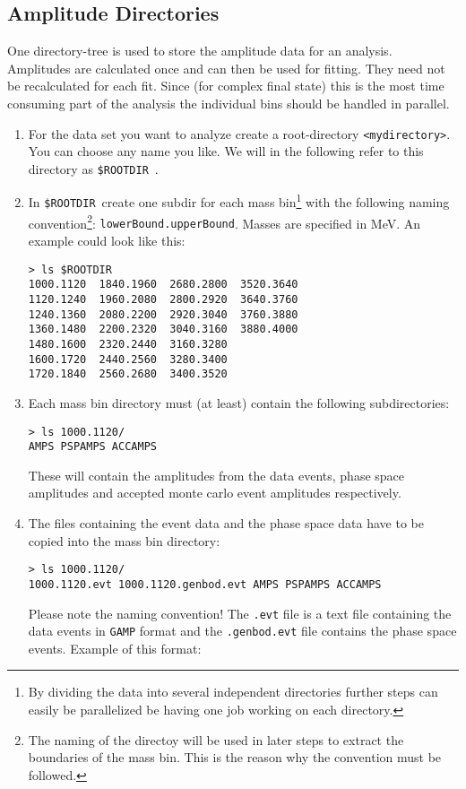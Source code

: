 \documentclass[12pt,a4paper]{article}
\newcommand{\rootdir} {{\tt \$ROOTDIR}~}
\begin{document}
{\subsection{Amplitude Directories}
One directory-tree is used to store the amplitude data for an analysis. Amplitudes are calculated once and can then be used for fitting. They need not be recalculated for each fit. Since (for complex final state) this is the most time consuming part of the analysis the individual bins should be handled in parallel.
\begin{enumerate}
\item For the data set you want to analyze create a root-directory {\tt <mydirectory>}. You can choose any name you like. We will in the following refer to this directory as \rootdir.
\item In \rootdir create one subdir for each mass bin\footnote{By dividing the data into several independent directories further steps can easily be parallelized be having one job working on each directory.} with the following naming convention\footnote{The naming of the directoy will be used in later steps to extract the boundaries of the mass bin. This is the reason why the convention must be followed.}: {\tt lowerBound.upperBound}. Masses are specified in MeV. An example could look like this:
\begin{verbatim}
> ls $ROOTDIR
1000.1120  1840.1960  2680.2800  3520.3640
1120.1240  1960.2080  2800.2920  3640.3760
1240.1360  2080.2200  2920.3040  3760.3880
1360.1480  2200.2320  3040.3160  3880.4000
1480.1600  2320.2440  3160.3280
1600.1720  2440.2560  3280.3400
1720.1840  2560.2680  3400.3520
\end{verbatim}
\item Each mass bin directory must (at least) contain the following subdirectories:
\begin{verbatim}
> ls 1000.1120/
AMPS PSPAMPS ACCAMPS
\end{verbatim}
These will contain the amplitudes from the data events, phase space amplitudes and accepted monte carlo event amplitudes respectively.
\item The files containing the event data and the phase space data have to be copied into the mass bin directory:
\begin{verbatim}
> ls 1000.1120/
1000.1120.evt 1000.1120.genbod.evt AMPS PSPAMPS ACCAMPS
\end{verbatim}
Please note the naming convention! The {\tt .evt} file is a text file containing the data events in {\tt GAMP} format and the {\tt .genbod.evt} file contains the phase space events. Example of this format:

\end{enumerate}}
\end{document}
